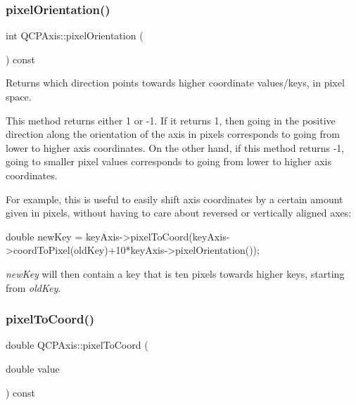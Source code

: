 \mbox{\label{class_q_c_p_axis_a45c45bed7e5666683b8d56afa66fa51f}} 
\subsubsection{\texorpdfstring{pixel\+Orientation()}{pixelOrientation()}}
{\footnotesize\ttfamily int Q\+C\+P\+Axis\+::pixel\+Orientation (\begin{DoxyParamCaption}{ }\end{DoxyParamCaption}) const\hspace{0.3cm}{\ttfamily [inline]}}

Returns which direction points towards higher coordinate values/keys, in pixel space.

This method returns either 1 or -\/1. If it returns 1, then going in the positive direction along the orientation of the axis in pixels corresponds to going from lower to higher axis coordinates. On the other hand, if this method returns -\/1, going to smaller pixel values corresponds to going from lower to higher axis coordinates.

For example, this is useful to easily shift axis coordinates by a certain amount given in pixels, without having to care about reversed or vertically aligned axes\+:


\begin{DoxyCode}
\textcolor{keywordtype}{double} newKey = keyAxis->pixelToCoord(keyAxis->coordToPixel(oldKey)+10*keyAxis->pixelOrientation());
\end{DoxyCode}


{\itshape new\+Key} will then contain a key that is ten pixels towards higher keys, starting from {\itshape old\+Key}. \mbox{\label{class_q_c_p_axis_a536ef8f624cac59b6b6fdcb495723c57}} 
\subsubsection{\texorpdfstring{pixel\+To\+Coord()}{pixelToCoord()}}
{\footnotesize\ttfamily double Q\+C\+P\+Axis\+::pixel\+To\+Coord (\begin{DoxyParamCaption}\item[{double}]{value }\end{DoxyParamCaption}) const}

